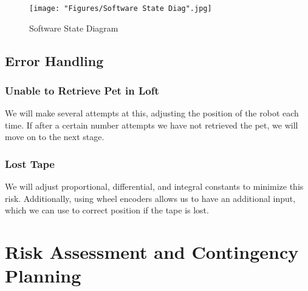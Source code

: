 \documentclass[11pt, oneside]{article} %
\begin{document}
\begin{figure}[h]
	\centering
	\texttt{[image: "Figures/Software State Diag".jpg]}
	\caption[Software State Diagram]{Software State Diagram}
	\label{fig:SoftStates}
\end{figure}

	\subsection{Error Handling}
		\subsubsection{Unable to Retrieve Pet in Loft}
		We will make several attempts at this, adjusting the position of the robot each time. If after a certain number attempts we have not retrieved the pet, we will move on to the next stage.
		\subsubsection{Lost Tape}
		We will adjust proportional, differential, and integral constants to minimize this risk. Additionally, using wheel encoders allows us to have an additional input, which we can use to correct position if the tape is lost.


\section{Risk Assessment and Contingency Planning}
\end{document}
